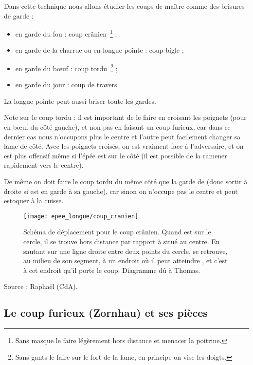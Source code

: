 \begin{technique}
Dans cette technique nous allons étudier les coups de maître comme des brisures de garde :
\begin{itemize}
	\item \D en garde du fou : coup crânien~\footnote{Sans masque le faire légèrement hors distance et menacer la poitrine.} ;
	\item \D en garde de la charrue ou en longue pointe : coup bigle ;
	\item \D en garde du bœuf : coup tordu~\footnote{Sans gants le faire sur le fort de la lame, en principe on vise les doigts.} ;
	\item \D en garde du jour : coup de travers.
\end{itemize}
La longue pointe peut aussi briser toute les gardes.

Note sur le coup tordu : il est important de le faire en croisant les poignets (pour \D en bœuf du côté gauche), et non pas en faisant un coup furieux, car dans ce dernier cas nous n'occupons plus le centre et l'autre peut facilement changer sa lame de côté. Avec les poignets croisés, on est vraiment face à l'adversaire, et on est plus offensif même si l'épée est sur le côté (il est possible de la ramener rapidement vers le centre).

De même on doit faire le coup tordu du même côté que la garde de \D (donc sortir à droite si \D est en garde à sa gauche), car sinon on n'occupe pas le centre et \D peut estoquer à la cuisse.

\begin{figure}[ht]
	\centering
	\texttt{[image: epee\_longue/coup\_cranien]}
	\caption{Schéma de déplacement pour le coup crânien. Quand \A est sur le cercle, il se trouve hors distance par rapport à \D situé au centre. En sautant sur une ligne droite entre deux points du cercle, \A se retrouve, au milieu de son segment, à un endroit où il peut atteindre \D, et c'est à cet endroit qu'il porte le coup. Diagramme dû à Thomas.}
\end{figure}

Source : Raphaël (CdA).
\end{technique}



\subsection{Le coup furieux (Zornhau) et ses pièces}


